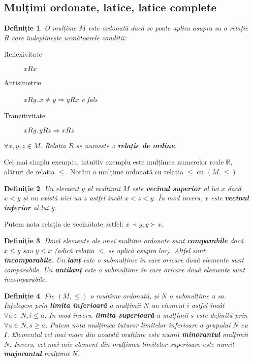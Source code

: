 \documentclass[12pt, a4paper, twoside, romanian]{teza-upb}
\newtheorem{defn}{Definiție}
\begin{document}
    \subsection{Mulțimi ordonate, latice, latice complete}
    \begin{defn}
      O mulțime $M$ este ordonată dacă se poate aplica asupra sa o relație $R$ care îndeplinește următoarele condiții:
      \begin{description}
        \item [Reflexivitate] $xRx$
        \item [Antisimetrie] $xRy, x \neq y \Rightarrow yRx$ e fals
        \item [Tranzitivitate] $xRy, yRz \Rightarrow xRz$
      \end{description}
      $\forall x, y,z \in M$. Relația $R$ se numește o \textbf{relație de ordine}.
    \end{defn}

    Cel mai simplu exemplu, intuitiv exemplu este mulțimea numerelor reale $ \mathbb{R}$, alături de relația $\le$. Notăm o mulțime ordonată cu relația $\le$ cu $(M, \le)$.

    \begin{defn}
      Un element $y$ al mulțimii $M$ este \textbf{vecinul superior} al lui $x$ dacă $x < y$ și nu există nici un $z$ astfel încât $x < z < y$. În mod invers, $x$ este \textbf{vecinul inferior} al lui $y$.
    \end{defn}

    Putem nota relația de vecinătate astfel: $x \prec y, y \succ x$.

    \begin{defn}
      Două elemente ale unei mulțimi ordonate sunt \textbf{comparabile} dacă $x \le y$ sau $y \le x$ (adică relația $\le$ se aplică asupra lor). Altfel sunt \textbf{incomparabile}. Un \textbf{lanț} este o submulțime în care oricare două elemente sunt comparabile. Un \textbf{antilanț} este o submulțime în care oricare două elemente sunt incomparabile.
    \end{defn}

    \begin{defn}
      Fie $(M, \le)$ o mulțime ordonată, și $N$ o submulțime a sa. Înțelegem prin \textbf{limita inferioară} a mulțimii $N$ un element $i$ astfel încât $\forall a \in N, i \le a$. În mod invers, \textbf{limita superioară} a mulțimii $s$ este definită prin $\forall a \in N, s \ge a$.
      Putem nota mulțimea tuturor limitelor inferioare a grupului $N$ cu $I$. Elementul cel mai mare din această mulțime este numit \textbf{minorantul} mulțimii $N$. Invers, cel mai mic element din mulțimea limitelor superioare este numit \textbf{majorantul} mulțimii $N$.
    \end{defn}
\end{document}
